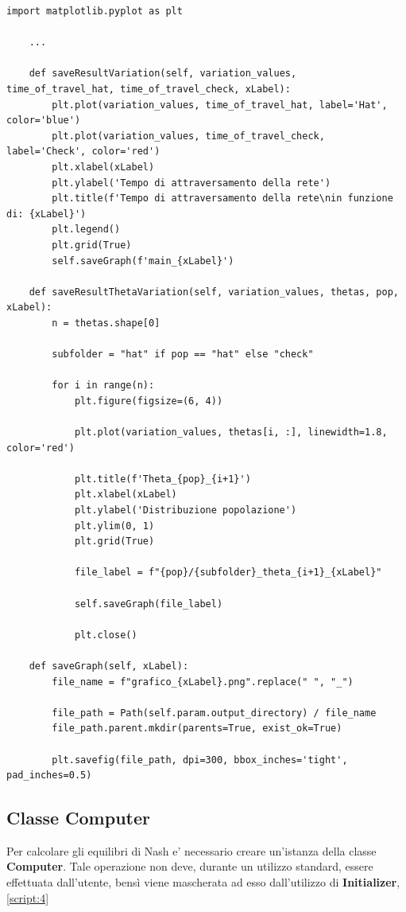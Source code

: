 \begin{lstlisting}[style=myStile, caption={Initializer::showResultPlot}, label={script:7}]
    import matplotlib.pyplot as plt

    ...

    def saveResultVariation(self, variation_values, time_of_travel_hat, time_of_travel_check, xLabel):
        plt.plot(variation_values, time_of_travel_hat, label='Hat', color='blue')
        plt.plot(variation_values, time_of_travel_check, label='Check', color='red')
        plt.xlabel(xLabel)
        plt.ylabel('Tempo di attraversamento della rete')
        plt.title(f'Tempo di attraversamento della rete\nin funzione di: {xLabel}')
        plt.legend()
        plt.grid(True)
        self.saveGraph(f'main_{xLabel}')
        
    def saveResultThetaVariation(self, variation_values, thetas, pop, xLabel):
        n = thetas.shape[0]

        subfolder = "hat" if pop == "hat" else "check"

        for i in range(n):
            plt.figure(figsize=(6, 4))

            plt.plot(variation_values, thetas[i, :], linewidth=1.8, color='red')

            plt.title(f'Theta_{pop}_{i+1}')
            plt.xlabel(xLabel)
            plt.ylabel('Distribuzione popolazione')
            plt.ylim(0, 1)
            plt.grid(True)

            file_label = f"{pop}/{subfolder}_theta_{i+1}_{xLabel}"

            self.saveGraph(file_label)

            plt.close() 
            
    def saveGraph(self, xLabel):
        file_name = f"grafico_{xLabel}.png".replace(" ", "_")

        file_path = Path(self.param.output_directory) / file_name
        file_path.parent.mkdir(parents=True, exist_ok=True)

        plt.savefig(file_path, dpi=300, bbox_inches='tight', pad_inches=0.5)
\end{lstlisting}

\subsection{Classe Computer}
\label{subsec:Computer}

Per calcolare gli equilibri di Nash e' necessario creare un'istanza della classe \textbf{Computer}. Tale operazione non deve, durante un utilizzo standard, essere effettuata dall'utente,
bensì viene mascherata ad esso dall'utilizzo di \textbf{Initializer}, \autoref{script:4}

